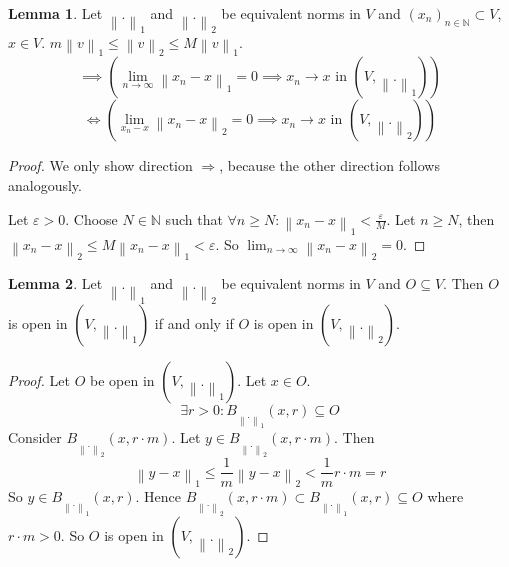 \documentclass[a4paper,landscape,twocolumn]{article}
\theoremstyle{definition}
\newtheorem{lemma}{Lemma}
\newcommand\norm[1]{\left\|#1\right\|}
\begin{document}
\begin{lemma}
  Let $\norm{.}_1$ and $\norm{.}_2$ be equivalent norms in $V$ and $(x_n)_{n\in\mathbb N} \subset V$, $x \in V$. $m \norm{v}_1 \leq \norm{v}_2 \leq M \norm{v}_1$.
  \[ \implies \left(\lim_{n\to\infty} \norm{x_n - x}_1 = 0
       \implies x_n \to x \text{ in } (V, \norm{.}_1)\right) \]
  \[ \iff \left(\lim_{x_n - x} \norm{x_n - x}_2 = 0
       \implies x_n \to x \text{ in } (V, \norm{.}_2)\right) \]
\end{lemma}

\begin{proof}
  We only show direction $\Rightarrow$, because the other direction follows analogously.

  Let $\varepsilon > 0$. Choose $N \in \mathbb N$ such that $\forall n \geq N: \norm{x_n - x}_1 < \frac{\varepsilon}{M}$.
  Let $n \geq N$, then $\norm{x_n - x}_2 \leq M \norm{x_n - x}_1 < \varepsilon$.
  So $\lim_{n\to\infty} \norm{x_n - x}_2 = 0$.
\end{proof}

\begin{lemma}
  Let $\norm{.}_1$ and $\norm{.}_2$ be equivalent norms in $V$ and $O \subseteq V$.
  Then $O$ is open in $(V, \norm{.}_1)$ if and only if $O$ is open in $(V, \norm{.}_2)$.
\end{lemma}
\begin{proof}
  Let $O$ be open in $(V, \norm{.}_1)$.
  Let $x \in O$.
  \[ \exists r > 0: B_{\norm{.}_1}(x, r) \subseteq O \]
  Consider $B_{\norm{.}_2}(x, r \cdot m)$. Let $y \in B_{\norm{.}_2}(x, r \cdot m)$.
  Then
  \[ \norm{y - x}_1 \leq \frac1m \norm{y - x}_2 < \frac{1}{m} r \cdot m = r \]
  So $y \in B_{\norm{.}_1}(x, r)$. Hence $B_{\norm{.}_2}(x, r \cdot m) \subset B_{\norm{.}_1}(x, r) \subseteq O$ where $r \cdot m > 0$. So $O$ is open in $(V, \norm{.}_2)$.
\end{proof}
\end{document}

